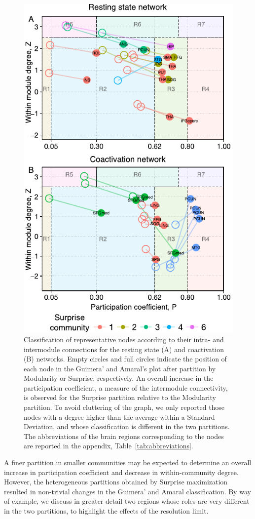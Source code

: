 \begin{figure}[ht!]
\centering
\includegraphics[width=0.5\linewidth]{images/figure_6_ga_rs_coact.pdf}
\caption{Classification of representative nodes according to their intra- and intermodule connections for the resting state (A) and coactivation (B) networks. Empty circles and full circles indicate the position of each node in the Guimera' and Amaral’s plot after partition by Modularity or Surprise, respectively. An overall increase in the participation coefficient, a measure of the intermodule connectivity, is observed for the Surprise partition relative to the Modularity partition. To avoid cluttering of the graph, we only reported those nodes with a degree higher than the average within a Standard Deviation, and whose classification is different in the two partitions. The abbreviations of the brain regions corresponding to the nodes are reported in the appendix, Table~\ref{tab:abbreviations}.}
\label{fig:figure_6_ga_rs_coact}
\end{figure}

A finer partition in smaller communities may be expected to determine an overall increase in participation coefficient and decrease in within-community degree. However, the heterogeneous partitions obtained by Surprise maximization resulted in non-trivial changes in the Guimera' and Amaral classification.  By way of example, we discuss in greater detail two regions whose roles are very different in the two partitions, to highlight the effects of the resolution limit.

